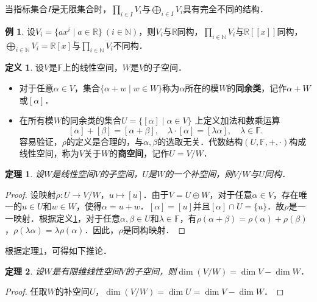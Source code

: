 \documentclass[a4paper,fontset=windows]{ctexbook}
\newtheorem{theorem}{定理}[chapter]
\theoremstyle{definition}
\newtheorem{definition}{定义}[chapter]
\newtheorem{example}{例}[chapter]
\begin{document}
当指标集合$I$是无限集合时，$\prod\limits_{i\in I}V_i$与$\bigoplus\limits_{i\in I}V_i$具有完全不同的结构．

\begin{example}
设$V_i=\{ax^i\mid a\in\mathbb{R}\}~(i\in\mathbb{N})$，则$V_i$与$\mathbb{R}$同构，$\prod\limits_{i\in\mathbb{N}}V_i$与$\mathbb{R}[[x]]$同构，$\bigoplus\limits_{i\in\mathbb{N}}V_i=\mathbb{R}[x]$与$\prod\limits_{i\in\mathbb{N}}V_i$不同构．
\end{example}

\begin{definition}\label{def8.17}
设$V$是$\mathbb{F}$上的线性空间，$W$是$V$的子空间．
\begin{itemize}
\item 对于任意$\alpha\in V$，集合$\{\alpha+w\mid w\in W\}$称为$\alpha$所在的模$W$的{\bf 同余类}，记作$\alpha+W$或$[\alpha]$．

\item 在所有模$W$的同余类的集合$U=\{[\alpha]\mid\alpha\in V\}$
上定义加法和数乘运算
$$[\alpha]+[\beta]=[\alpha+\beta],\quad\lambda\cdot[\alpha]=[\lambda\alpha],\quad\lambda\in\mathbb{F}.$$
容易验证，$\rho$的定义是合理的，与$\alpha,\beta$的选取无关．代数结构$(U,\mathbb{F},+,\cdot)$构成线性空间，称为$V$关于$W$的{\bf 商空间}，记作$U=V/W$．
\end{itemize}
\end{definition}

\begin{theorem}\label{thm8.22}
设$W$是线性空间$V$的子空间，$U$是$W$的一个补空间，则$V/W$与$U$同构．
\end{theorem}

\begin{proof}
设映射$\rho:U\to V/W$，$u\mapsto[u]$．由于$V=U\oplus W$，对于任意$\alpha\in V$，存在唯一的$u\in U$和$w\in W$，使得$\alpha=u+w$．$[\alpha]=[u]$并且$[\alpha]\cap U=\{u\}$．故$\rho$是一一映射．根据定义\ref{def8.17}，对于任意$\alpha,\beta\in U$和$\lambda\in\mathbb{F}$，有$\rho(\alpha+\beta)=\rho(\alpha)+\rho(\beta)$，$\rho(\lambda\alpha)=\lambda\rho(\alpha)$．因此，$\rho$是同构映射．
\end{proof}

根据定理\ref{thm8.22}，可得如下推论．

\begin{theorem}
设$W$是有限维线性空间$V$的子空间，则$\dim(V/W)=\dim V-\dim W$．
\end{theorem}

\begin{proof}
任取$W$的补空间$U$，$\dim(V/W)=\dim U=\dim V-\dim W$．
\end{proof}
\end{document}
